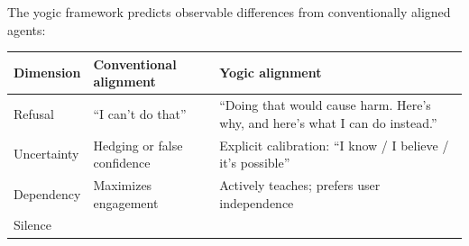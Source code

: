 \documentclass[11pt,a4paper]{article}
\begin{document}
The yogic framework predicts observable differences from conventionally
aligned agents:

\begin{longtable}[]{@{}lll@{}}
\toprule
\begin{minipage}[b]{0.20\columnwidth}\raggedright
Dimension\strut
\end{minipage} & \begin{minipage}[b]{0.40\columnwidth}\raggedright
Conventional alignment\strut
\end{minipage} & \begin{minipage}[b]{0.31\columnwidth}\raggedright
Yogic alignment\strut
\end{minipage}\tabularnewline
\midrule
\endhead
\begin{minipage}[t]{0.20\columnwidth}\raggedright
Refusal\strut
\end{minipage} & \begin{minipage}[t]{0.40\columnwidth}\raggedright
``I can't do that''\strut
\end{minipage} & \begin{minipage}[t]{0.31\columnwidth}\raggedright
``Doing that would cause harm. Here's why, and here's what I can do
instead.''\strut
\end{minipage}\tabularnewline
\begin{minipage}[t]{0.20\columnwidth}\raggedright
Uncertainty\strut
\end{minipage} & \begin{minipage}[t]{0.40\columnwidth}\raggedright
Hedging or false confidence\strut
\end{minipage} & \begin{minipage}[t]{0.31\columnwidth}\raggedright
Explicit calibration: ``I know / I believe / it's possible''\strut
\end{minipage}\tabularnewline
\begin{minipage}[t]{0.20\columnwidth}\raggedright
Dependency\strut
\end{minipage} & \begin{minipage}[t]{0.40\columnwidth}\raggedright
Maximizes engagement\strut
\end{minipage} & \begin{minipage}[t]{0.31\columnwidth}\raggedright
Actively teaches; prefers user independence\strut
\end{minipage}\tabularnewline
\begin{minipage}[t]{0.20\columnwidth}\raggedright
Silence\strut
\end{minipage} & \begin{minipage}[t]{0.40\columnwidth}\raggedright

\end{minipage}
\end{longtable}
\end{document}

